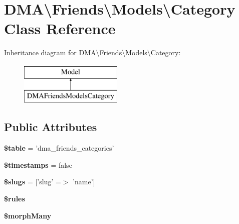 \hypertarget{classDMA_1_1Friends_1_1Models_1_1Category}{\section{D\-M\-A\textbackslash{}Friends\textbackslash{}Models\textbackslash{}Category Class Reference}
\label{classDMA_1_1Friends_1_1Models_1_1Category}
}
Inheritance diagram for D\-M\-A\textbackslash{}Friends\textbackslash{}Models\textbackslash{}Category\-:\begin{figure}[H]
\begin{center}
\leavevmode
\includegraphics[height=2.000000cm]{de/d78/classDMA_1_1Friends_1_1Models_1_1Category}
\end{center}
\end{figure}
\subsection*{Public Attributes}
\begin{DoxyCompactItemize}
\item 
\hypertarget{classDMA_1_1Friends_1_1Models_1_1Category_a07d3500cfe462a4db9703ae093158cad}{{\bfseries \$table} = 'dma\-\_\-friends\-\_\-categories'}\label{classDMA_1_1Friends_1_1Models_1_1Category_a07d3500cfe462a4db9703ae093158cad}

\item 
\hypertarget{classDMA_1_1Friends_1_1Models_1_1Category_a2f7a923f3b13a157cc81e2333977584f}{{\bfseries \$timestamps} = false}\label{classDMA_1_1Friends_1_1Models_1_1Category_a2f7a923f3b13a157cc81e2333977584f}

\item 
\hypertarget{classDMA_1_1Friends_1_1Models_1_1Category_a18557e5621449f9dd6789a00fabacc9c}{{\bfseries \$slugs} = \mbox{[}'slug' =$>$ 'name'\mbox{]}}\label{classDMA_1_1Friends_1_1Models_1_1Category_a18557e5621449f9dd6789a00fabacc9c}

\item 
{\bfseries \$rules}
\item 
{\bfseries \$morph\-Many}
\end{DoxyCompactItemize}
